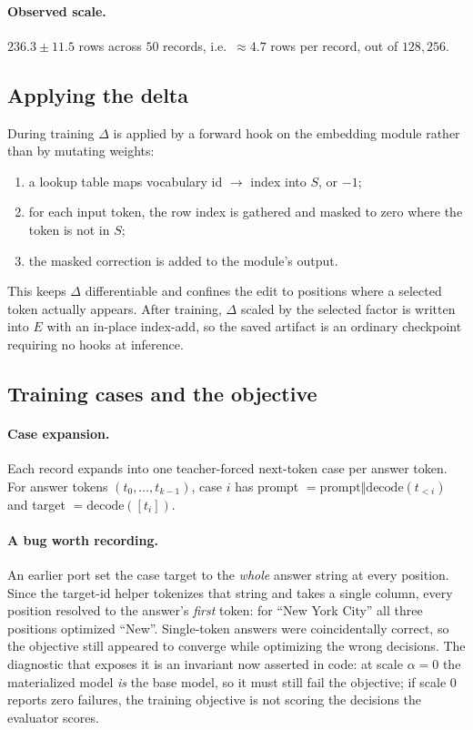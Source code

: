 \documentclass[11pt]{article}
\begin{document}
\paragraph{Observed scale.} $236.3 \pm 11.5$ rows across $50$ records, i.e.\
$\approx 4.7$ rows per record, out of $128{,}256$.

\subsection{Applying the delta}

During training $\Delta$ is applied by a forward hook on the embedding module
rather than by mutating weights:
\begin{enumerate}
\item a lookup table maps vocabulary id $\rightarrow$ index into $S$, or $-1$;
\item for each input token, the row index is gathered and masked to zero where
      the token is not in $S$;
\item the masked correction is added to the module's output.
\end{enumerate}
This keeps $\Delta$ differentiable and confines the edit to positions where a
selected token actually appears. After training, $\Delta$ scaled by the
selected factor is written into $E$ with an in-place index-add, so the saved
artifact is an ordinary checkpoint requiring no hooks at inference.

\subsection{Training cases and the objective}

\paragraph{Case expansion.} Each record expands into one teacher-forced
next-token case per answer token. For answer tokens $(t_0,\dots,t_{k-1})$, case
$i$ has prompt $= \text{prompt} \Vert \mathrm{decode}(t_{<i})$ and target
$= \mathrm{decode}([t_i])$.

\paragraph{A bug worth recording.} An earlier port set the case target to the
\emph{whole} answer string at every position. Since the target-id helper
tokenizes that string and takes a single column, every position resolved to the
answer's \emph{first} token: for ``New York City'' all three positions
optimized ``New''. Single-token answers were coincidentally correct, so the
objective still appeared to converge while optimizing the wrong decisions. The
diagnostic that exposes it is an invariant now asserted in code: at scale
$\alpha = 0$ the materialized model \emph{is} the base model, so it must still
fail the objective; if scale $0$ reports zero failures, the training objective
is not scoring the decisions the evaluator scores.
\end{document}
